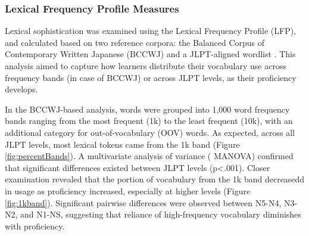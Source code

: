 \subsubsection{Lexical Frequency Profile Measures}
Lexical sophistication was examined using the Lexical Frequency Profile (LFP), and calculated based on two
reference corpora: the
Balanced Corpus of
Contemporary Written Japanese (BCCWJ) \citep{maekawa2014} and a JLPT-aligned wordlist \citep{jisho.org}. This
analysis aimed to capture how learners distribute their vocabulary use across frequency bands (in case of BCCWJ) or
across JLPT levels,
as their proficiency develops.




In the BCCWJ-based analysis, words were grouped into 1,000 word frequency bands ranging from the most frequent (1k)
to the
least frequent (10k), with an additional category for out-of-vocabulary (OOV) words. As expected, across all JLPT
levels, most lexical tokens came from the 1k band (Figure~
\ref{fig:percentBands}). A multivariate analysis of variance (
MANOVA)
confirmed that significant differences existed between JLPT levels (p<.001). Closer examination revealed that the
portion of vocabulary from the 1k band decreasedd in usage as proficiency increased, especially at higher levels (Figure~
\ref{fig:1kband}). Significant pairwise differences were observed between N5-N4, N3-N2, and N1-NS, suggesting that
reliance of high-frequency vocabulary diminishes with proficiency. %


